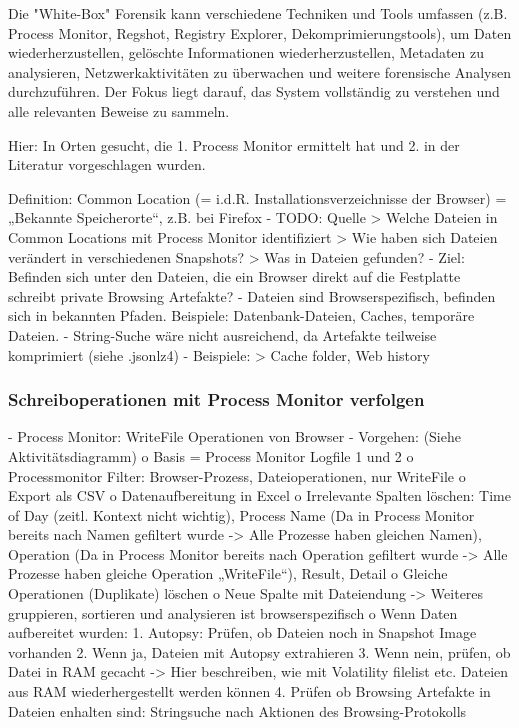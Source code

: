 	Die "White-Box" Forensik kann verschiedene Techniken und Tools umfassen (z.B. Process Monitor, Regshot, Registry Explorer, Dekomprimierungstools), um Daten wiederherzustellen, gelöschte Informationen wiederherzustellen, Metadaten zu analysieren, Netzwerkaktivitäten zu überwachen und weitere forensische Analysen durchzuführen. Der Fokus liegt darauf, das System vollständig zu verstehen und alle relevanten Beweise zu sammeln.
	
	Hier: In Orten gesucht, die 1. Process Monitor ermittelt hat und 2. in der Literatur vorgeschlagen wurden.

Definition: Common Location
	(= i.d.R. Installationsverzeichnisse der Browser) = „Bekannte Speicherorte“, z.B. bei Firefox   	
	- TODO: Quelle
		> Welche Dateien in Common Locations mit Process Monitor identifiziert
		> Wie haben sich Dateien verändert in verschiedenen Snapshots?
		> Was in Dateien gefunden?	
	-	Ziel: Befinden sich unter den Dateien, die ein Browser direkt auf die Festplatte schreibt private Browsing Artefakte?
	-	Dateien sind Browserspezifisch, befinden sich in bekannten Pfaden. Beispiele: Datenbank-Dateien, Caches, temporäre Dateien.
	-	String-Suche wäre nicht ausreichend, da Artefakte teilweise komprimiert (siehe .jsonlz4)	
	- Beispiele:
		> Cache folder, Web history \cite{Montasari.2015}

\subsubsection*{Schreiboperationen mit Process Monitor verfolgen}
- Process Monitor: WriteFile Operationen von Browser
- Vorgehen: (Siehe Aktivitätsdiagramm)
	o	Basis = Process Monitor Logfile 1 und 2
	o	Processmonitor Filter: Browser-Prozess, Dateioperationen, nur WriteFile
	o	Export als CSV
	o	Datenaufbereitung in Excel
	o	Irrelevante Spalten löschen: Time of Day (zeitl. Kontext nicht wichtig), Process Name (Da in Process Monitor bereits nach Namen gefiltert wurde -> Alle Prozesse haben gleichen Namen), Operation (Da in Process Monitor bereits nach Operation gefiltert wurde -> Alle Prozesse haben gleiche Operation „WriteFile“), Result, Detail
	o	Gleiche Operationen (Duplikate) löschen
	o	Neue Spalte mit Dateiendung
	-> Weiteres gruppieren, sortieren und analysieren ist browserspezifisch
	o	Wenn Daten aufbereitet wurden: 
	1.	Autopsy: Prüfen, ob Dateien noch in Snapshot Image vorhanden
	2.	Wenn ja, Dateien mit Autopsy extrahieren 
	3.	Wenn nein, prüfen, ob Datei in RAM gecacht
	-> Hier beschreiben, wie mit Volatility filelist etc. Dateien aus RAM wiederhergestellt werden können
	4.	Prüfen ob Browsing Artefakte in Dateien enhalten sind: Stringsuche nach Aktionen des Browsing-Protokolls
	
